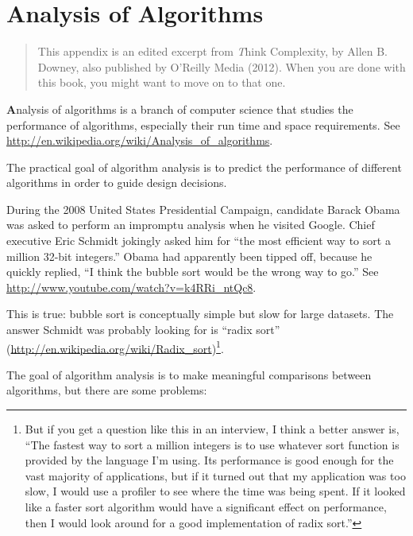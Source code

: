 \documentclass[
DIV=11,
fontsize=12,
twoside,
headinclude=false,
titlepage=firstiscover,
abstract=true,
headsepline=true,
footsepline=true,
chapterprefix=true, %
headings=big,
bibliography=totoc,%
captions=tableheading
]{scrbook}
\theoremstyle{definition}
\begin{document}
\chapter{Analysis of Algorithms}
\label{algorithms}

\begin{quote}
This appendix is an edited excerpt from {\textit Think Complexity}, by
Allen B. Downey, also published by O'Reilly Media (2012).  When you
are done with this book, you might want to move on to that one.
\end{quote}

{\textbf Analysis of algorithms} is a branch of computer science that
studies the performance of algorithms, especially their run time and
space requirements.  See
\url{http://en.wikipedia.org/wiki/Analysis_of_algorithms}.
 

The practical goal of algorithm analysis is to predict the performance
of different algorithms in order to guide design decisions.

During the 2008 United States Presidential Campaign, candidate
Barack Obama was asked to perform an impromptu analysis when
he visited Google.  Chief executive Eric Schmidt jokingly asked him
for ``the most efficient way to sort a million 32-bit integers.''
Obama had apparently been tipped off, because he quickly
replied, ``I think the bubble sort would be the wrong way to go.''
See \url{http://www.youtube.com/watch?v=k4RRi_ntQc8}.

This is true: bubble sort is conceptually simple but slow for
large datasets.  The answer Schmidt was probably looking for is
``radix sort'' (\url{http://en.wikipedia.org/wiki/Radix_sort})\footnote{
But if you get a question like this in an interview, I think
a better answer is, ``The fastest way to sort a million integers
is to use whatever sort function is provided by the language
I'm using.  Its performance is good enough for the vast majority
of applications, but if it turned out that my application was too
slow, I would use a profiler to see where the time was being
spent.  If it looked like a faster sort algorithm would have
a significant effect on performance, then I would look
around for a good implementation of radix sort.''}.

The goal of algorithm analysis is to make meaningful
comparisons between algorithms, but there are some problems:
\end{document}
